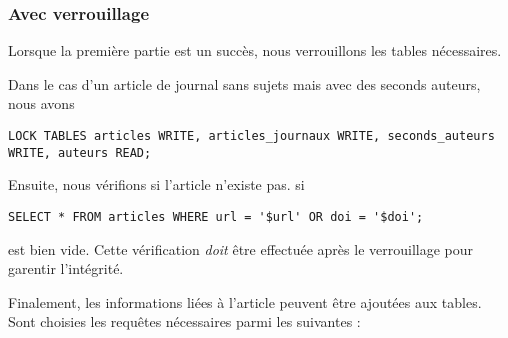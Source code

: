 \documentclass[a4paper, 12pt]{article}
\begin{document}
    \subsubsection{Avec verrouillage}
    Lorsque la première partie est un succès, nous verrouillons les tables nécessaires.
    
    Dans le cas d'un article de journal sans sujets mais avec des seconds auteurs, nous avons
    \begin{lstlisting}[style=sql, gobble=8]
        LOCK TABLES articles WRITE, articles_journaux WRITE, seconds_auteurs WRITE, auteurs READ;
    \end{lstlisting}
    Ensuite, nous vérifions si l'article n'existe pas. \Cad{} si
    \begin{lstlisting}[style=sql, gobble=8]
        SELECT * FROM articles WHERE url = '$url' OR doi = '$doi';
    \end{lstlisting}
    est bien vide. Cette vérification \emph{doit} être effectuée après le verrouillage pour garentir l'intégrité. \par
    Finalement, les informations liées à l'article peuvent être ajoutées aux tables. Sont choisies les requêtes nécessaires parmi les suivantes :
\end{document}
